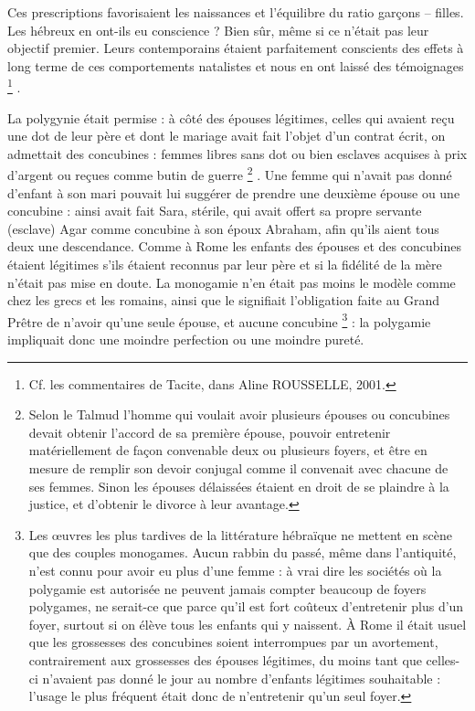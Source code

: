  Ces prescriptions favorisaient les naissances et l'équilibre du ratio garçons -- filles. Les hébreux en ont-ils eu conscience ? Bien sûr, même si ce n'était pas leur objectif premier. Leurs contemporains étaient parfaitement conscients des effets à long terme de ces comportements natalistes et nous en ont laissé des témoignages%
\footnote{Cf. les commentaires de Tacite, dans Aline ROUSSELLE, 2001.}%
.

 La polygynie était permise : à côté des épouses légitimes, celles qui avaient reçu une dot de leur père et dont le mariage avait fait l'objet d'un contrat écrit, on admettait des concubines : femmes libres sans dot ou bien esclaves acquises à prix d'argent ou reçues comme butin de guerre%
\footnote{Selon le Talmud l'homme qui voulait avoir plusieurs épouses ou concubines devait obtenir l'accord de sa première épouse, pouvoir entretenir matériellement de façon convenable deux ou plusieurs foyers, et être en mesure de remplir son devoir conjugal comme il convenait avec chacune de ses femmes. Sinon les épouses délaissées étaient en droit de se plaindre à la justice, et d'obtenir le divorce à leur avantage.}%
. Une femme qui n'avait pas donné d'enfant à son mari pouvait lui suggérer de prendre une deuxième épouse ou une concubine : ainsi avait fait Sara, stérile, qui avait offert sa propre servante (esclave) Agar comme concubine à son époux Abraham, afin qu'ils aient tous deux une descendance. Comme à Rome les enfants des épouses et des concubines étaient légitimes s'ils étaient reconnus par leur père et si la fidélité de la mère n'était pas mise en doute. La monogamie n'en était pas moins le modèle comme chez les grecs et les romains, ainsi que le signifiait l'obligation faite au Grand Prêtre de n'avoir qu'une seule épouse, et aucune concubine%
\footnote{Les œuvres les plus tardives de la littérature hébraïque ne mettent en scène que des couples monogames. Aucun rabbin du passé, même dans l'antiquité, n'est connu pour avoir eu plus d'une femme : à vrai dire les sociétés où la polygamie est autorisée ne peuvent jamais compter beaucoup de foyers polygames, ne serait-ce que parce qu'il est fort coûteux d'entretenir plus d'un foyer, surtout si on élève tous les enfants qui y naissent. À Rome il était usuel que les grossesses des concubines soient interrompues par un avortement, contrairement aux grossesses des épouses légitimes, du moins tant que celles-ci n'avaient pas donné le jour au nombre d'enfants légitimes souhaitable : l'usage le plus fréquent était donc de n'entretenir qu'un seul foyer.}%
 : la polygamie impliquait donc une moindre perfection ou une moindre pureté.

